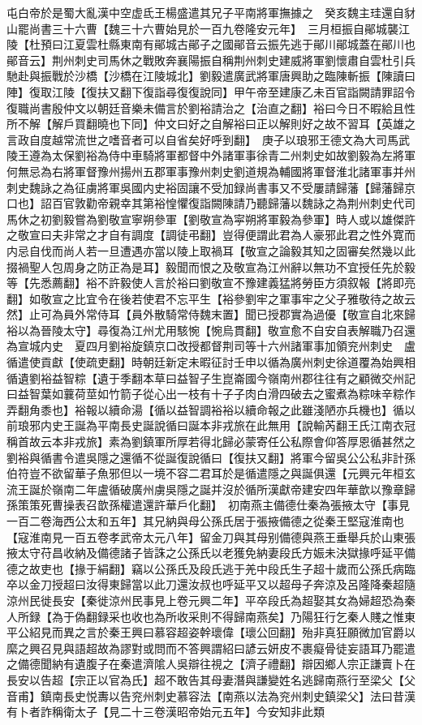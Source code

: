 屯白帝於是蜀大亂漢中空虚氐王楊盛遣其兄子平南將軍撫據之　癸亥魏主珪還自豺山罷尚書三十六曹【魏三十六曹始見於一百九卷隆安元年】　三月桓振自鄖城襲江陵【杜預曰江夏雲杜縣東南有鄖城古鄖子之國鄖音云振先逃于鄖川鄖城蓋在鄖川也鄖音云】荆州刺史司馬休之戰敗奔襄陽振自稱荆州刺史建威將軍劉懷肅自雲杜引兵馳赴與振戰於沙橋【沙橋在江陵城北】劉毅遣廣武將軍唐興助之臨陳斬振【陳讀曰陣】復取江陵【復扶又翻下復詣尋復復說同】甲午帝至建康乙未百官詣闕請罪詔令復職尚書殷仲文以朝廷音樂未備言於劉裕請治之【治直之翻】裕曰今日不暇給且性所不解【解戶買翻曉也下同】仲文曰好之自解裕曰正以解則好之故不習耳【英雄之言政自度越常流世之嗜音者可以自省矣好呼到翻】　庚子以琅邪王德文為大司馬武陵王遵為太保劉裕為侍中車騎將軍都督中外諸軍事徐青二州刺史如故劉毅為左將軍何無忌為右將軍督豫州揚州五郡軍事豫州刺史劉道規為輔國將軍督淮北諸軍事并州刺史魏詠之為征虜將軍吳國内史裕固讓不受加録尚書事又不受屢請歸藩【歸藩歸京口也】詔百官敦勸帝親幸其第裕惶懼復詣闕陳請乃聽歸藩以魏詠之為荆州刺史代司馬休之初劉毅嘗為劉敬宣寧朔參軍【劉敬宣為寜朔將軍毅為參軍】時人或以雄傑許之敬宣曰夫非常之才自有調度【調徒弔翻】豈得便謂此君為人豪邪此君之性外寛而内忌自伐而尚人若一旦遭遇亦當以陵上取禍耳【敬宣之論毅其知之固審矣然幾以此掇禍聖人包周身之防正為是耳】毅聞而恨之及敬宣為江州辭以無功不宜授任先於毅等【先悉薦翻】裕不許毅使人言於裕曰劉敬宣不豫建義猛將勞臣方須叙報【將即亮翻】如敬宣之比宜令在後若使君不忘平生【裕參劉牢之軍事牢之父子雅敬待之故云然】止可為員外常侍耳【員外散騎常侍魏末置】聞已授郡實為過優【敬宣自北來歸裕以為晉陵太守】尋復為江州尤用駭惋【惋烏貫翻】敬宣愈不自安自表解職乃召還為宣城内史　夏四月劉裕旋鎮京口改授都督荆司等十六州諸軍事加領兖州刺史　盧循遣使貢獻【使疏吏翻】時朝廷新定未暇征討壬申以循為廣州刺史徐道覆為始興相循遺劉裕益智粽【遺于季翻本草曰益智子生崑崙國今嶺南州郡往往有之顧微交州記曰益智葉如蘘荷莖如竹箭子從心出一枝有十子子肉白滑四破去之蜜煮為粽味辛粽作弄翻角黍也】裕報以續命湯【循以益智調裕裕以續命報之此雖淺陋亦兵機也】循以前琅邪内史王誕為平南長史誕說循曰誕本非戎旅在此無用【說輸芮翻王氏江南衣冠稱首故云本非戎旅】素為劉鎮軍所厚若得北歸必蒙寄任公私際會仰答厚恩循甚然之劉裕與循書令遣吳隱之還循不從誕復說循曰【復扶又翻】將軍今留吳公公私非計孫伯符豈不欲留華子魚邪但以一境不容二君耳於是循遣隱之與誕俱還【元興元年桓玄流王誕於嶺南二年盧循破廣州虜吳隱之誕并沒於循所漢獻帝建安四年華歆以豫章歸孫策策死曹操表召歆孫權遣還許華戶化翻】　初南燕主備德仕秦為張掖太守【事見一百二卷海西公太和五年】其兄納與母公孫氏居于張掖備德之從秦王堅寇淮南也【寇淮南見一百五卷孝武帝太元八年】留金刀與其母别備德與燕王垂舉兵於山東張掖太守苻昌收納及備德諸子皆誅之公孫氏以老獲免納妻段氏方娠未決獄掾呼延平備德之故吏也【掾于絹翻】竊以公孫氏及段氏逃于羌中段氏生子超十歲而公孫氏病臨卒以金刀授超曰汝得東歸當以此刀還汝叔也呼延平又以超母子奔涼及呂隆降秦超隨涼州民徙長安【秦徙涼州民事見上卷元興二年】平卒段氏為超娶其女為婦超恐為秦人所録【為于偽翻録采也收也為所收采則不得歸南燕矣】乃陽狂行乞秦人賤之惟東平公紹見而異之言於秦王興曰慕容超姿幹瓌偉【瓌公回翻】殆非真狂願微加官爵以縻之興召見與語超故為謬對或問而不答興謂紹曰諺云妍皮不裹癡骨徒妄語耳乃罷遣之備德聞納有遺腹子在秦遣濟隂人吳辯往視之【濟子禮翻】辯因鄉人宗正謙賣卜在長安以告超【宗正以官為氏】超不敢告其母妻潛與謙變姓名逃歸南燕行至梁父【父音甫】鎮南長史悦夀以告兖州刺史慕容法【南燕以法為兖州刺史鎮梁父】法曰昔漢有卜者詐稱衛太子【見二十三卷漢昭帝始元五年】今安知非此類